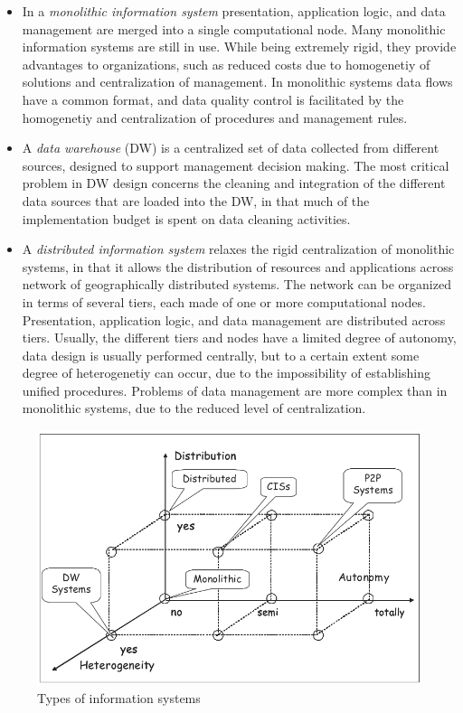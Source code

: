 \begin{itemize}
    \item{In a \textit{monolithic information system} presentation, application logic, and data management are merged into a single computational node.
    Many monolithic information systems are still in use. While being extremely rigid, they provide advantages to organizations, such as reduced costs due to homogenetiy of solutions and centralization of management.
    In monolithic systems data flows have a common format, and data quality control is facilitated by the homogenetiy and centralization of procedures and management rules.}
    \item {A \textit{data warehouse} (DW) is a centralized set of data collected from different sources, designed to support management decision making. The most critical problem in DW design concerns the cleaning and integration of 
    the different data sources that are loaded into the DW, in that much of the implementation budget is spent on data cleaning activities.}
    \item{A \textit{distributed information system} relaxes the rigid centralization of monolithic systems, in that it allows the distribution of resources and applications across
    network of geographically distributed systems.
    The network can be organized in terms of several tiers, each made of one or more computational nodes. Presentation, application logic, and data management are distributed across tiers. Usually, the different tiers and nodes have a limited degree of autonomy, 
    data design is usually performed centrally, but to a certain extent some degree of heterogenetiy can occur, due to the impossibility of establishing unified procedures.
    Problems of data management are more complex than in monolithic systems, due to the reduced level of centralization.
    }  
\end{itemize}

\begin{figure}[h]
\vspace*{.0in}
\centering
\includegraphics[scale=.50]{types-of-information-systems}
\caption{Types of information systems}    
\end{figure}

